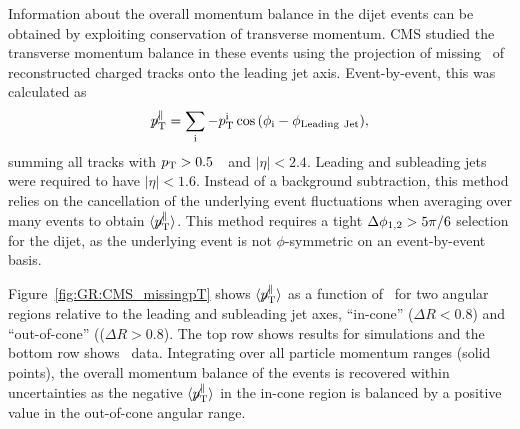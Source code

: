 Information about the overall momentum balance in the dijet events can be obtained by exploiting
conservation of transverse momentum. CMS studied the transverse momentum balance in these events
using the projection of missing \pT\ of reconstructed charged tracks onto the leading jet axis. 
Event-by-event, this was calculated as 
\begin{equation}
\displaystyle{\not} p_{\mathrm{T}}^{\parallel} =
\sum_{\rm i}{ -p_{\mathrm{T}}^{\rm i}\cos{(\phi_{\rm i}-\phi_{\rm Leading\ Jet})}},
\end{equation}
summing all tracks with $\mbox{$p_{\mathrm{T}}$} > 0.5$~\GeVc\ and $|\eta| < 2.4$. 
Leading and subleading jets were required to have $|\eta| < 1.6$.
Instead of a background subtraction, this method relies on the cancellation of the 
underlying event fluctuations when averaging over many events to obtain 
$\langle \displaystyle{\not} p_{\mathrm{T}}^{\parallel} \rangle$.
This method requires a tight $\Delta\phi_{1,2} > 5 \pi/6$ selection for the dijet, as the underlying 
event is not $\phi$-symmetric on an event-by-event basis.

Figure~\ref{fig:GR:CMS_missingpT} shows $\langle \displaystyle{\not} p_{\mathrm{T}}^{\parallel} \rangle$
as a function of \AJ\ for two angular regions relative to the leading and subleading 
jet axes, ``in-cone'' ($\Delta R < 0.8$) and ``out-of-cone'' (($\Delta R > 0.8$). 
The top row shows results for  {} simulations and the bottom row shows
\PbPb\ data. Integrating over all particle momentum ranges (solid points),
 the overall momentum balance of the events is recovered within uncertainties 
as the negative $\langle \displaystyle{\not} p_{\mathrm{T}}^{\parallel} \rangle$ in 
the in-cone region is balanced by a positive value in the out-of-cone angular range.

